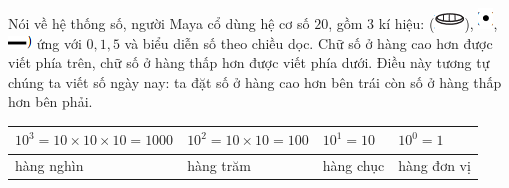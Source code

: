 	Nói về hệ thống số,  người Maya  cổ dùng hệ cơ số $20$, gồm $3$ kí hiệu:  (\includegraphics{29}),  \includegraphics{30}, \includegraphics{31}  ứng với $0,1, 5$ và biểu diễn số theo chiều dọc. Chữ số ở hàng cao hơn được viết phía trên, chữ số ở hàng thấp hơn được viết phía dưới. Điều này tương tự chúng ta viết số ngày nay: ta đặt số ở hàng cao hơn bên trái còn số ở hàng thấp hơn bên phải. 
	\begin{table}[H]
		\vspace*{-5pt}
			\begin{tabularx}{1\textwidth}{|m{3.5cm}|m{2.5cm}|m{1.5cm}|m{1.52cm}|}
			\hline
			$10^3 = 10\times 10 \times 10 =1000$
			&$10^2 = 10\times 10 =100$
			&$10^1 = 10$
			&$10^0 = 1$
			\\
			\hline
			hàng nghìn&hàng trăm &hàng chục &hàng đơn vị\\
			\hline
		\end{tabularx}
	\vspace*{-5pt}
	\end{table}
